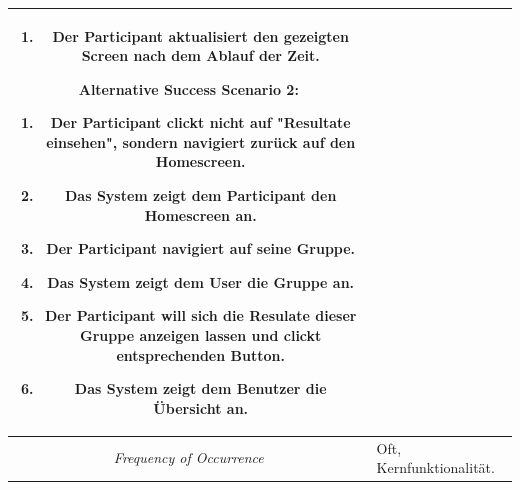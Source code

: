 \begin{center}
\begin{longtable}{| c | p{7cm} |}
\begin{enumerate}[label=1.\alph*,noitemsep]
			\item Der Participant aktualisiert den gezeigten Screen nach dem Ablauf der Zeit.
		\end{enumerate}
		Alternative Success Scenario 2:
		\begin{enumerate}[label=4.\alph*,noitemsep]
			\item Der Participant clickt nicht auf "Resultate einsehen", sondern navigiert zurück auf den Homescreen.
			\item Das System zeigt dem Participant den Homescreen an.
			\item Der Participant navigiert auf seine Gruppe.
			\item Das System zeigt dem User die Gruppe an.
			\item Der Participant will sich die Resulate dieser Gruppe anzeigen lassen und clickt entsprechenden Button.
			\item Das System zeigt dem Benutzer die Übersicht an.
		\end{enumerate}\\
		\hline
		\textit{Frequency of Occurrence} & Oft, Kernfunktionalität.\\
		\hline
	\end{longtable}
\end{center}



